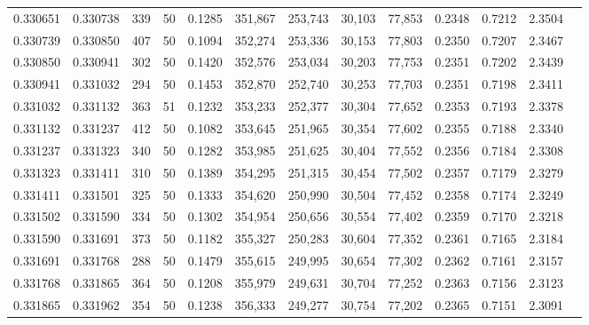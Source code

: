 \begin{tabular}{rrrrrrrrrrrrr}
0.330651 & 0.330738 &   339 &  50 &                                     0.1285 & 351,867 & 253,743 &  30,103 &  77,853 & 0.2348 & 0.7212 & 2.3504 \\
0.330739 & 0.330850 &   407 &  50 &                                     0.1094 & 352,274 & 253,336 &  30,153 &  77,803 & 0.2350 & 0.7207 & 2.3467 \\
0.330850 & 0.330941 &   302 &  50 &                                     0.1420 & 352,576 & 253,034 &  30,203 &  77,753 & 0.2351 & 0.7202 & 2.3439 \\
0.330941 & 0.331032 &   294 &  50 &                                     0.1453 & 352,870 & 252,740 &  30,253 &  77,703 & 0.2351 & 0.7198 & 2.3411 \\
0.331032 & 0.331132 &   363 &  51 &                                     0.1232 & 353,233 & 252,377 &  30,304 &  77,652 & 0.2353 & 0.7193 & 2.3378 \\
0.331132 & 0.331237 &   412 &  50 &                                     0.1082 & 353,645 & 251,965 &  30,354 &  77,602 & 0.2355 & 0.7188 & 2.3340 \\
0.331237 & 0.331323 &   340 &  50 &                                     0.1282 & 353,985 & 251,625 &  30,404 &  77,552 & 0.2356 & 0.7184 & 2.3308 \\
0.331323 & 0.331411 &   310 &  50 &                                     0.1389 & 354,295 & 251,315 &  30,454 &  77,502 & 0.2357 & 0.7179 & 2.3279 \\
0.331411 & 0.331501 &   325 &  50 &                                     0.1333 & 354,620 & 250,990 &  30,504 &  77,452 & 0.2358 & 0.7174 & 2.3249 \\
0.331502 & 0.331590 &   334 &  50 &                                     0.1302 & 354,954 & 250,656 &  30,554 &  77,402 & 0.2359 & 0.7170 & 2.3218 \\
0.331590 & 0.331691 &   373 &  50 &                                     0.1182 & 355,327 & 250,283 &  30,604 &  77,352 & 0.2361 & 0.7165 & 2.3184 \\
0.331691 & 0.331768 &   288 &  50 &                                     0.1479 & 355,615 & 249,995 &  30,654 &  77,302 & 0.2362 & 0.7161 & 2.3157 \\
0.331768 & 0.331865 &   364 &  50 &                                     0.1208 & 355,979 & 249,631 &  30,704 &  77,252 & 0.2363 & 0.7156 & 2.3123 \\
0.331865 & 0.331962 &   354 &  50 &                                     0.1238 & 356,333 & 249,277 &  30,754 &  77,202 & 0.2365 & 0.7151 & 2.3091 \\

\end{tabular}
